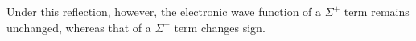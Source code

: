 Under this reflection, however, the electronic wave function of a $\Sigma^+$ term remains unchanged, whereas that of a $\Sigma^-$ term changes sign.
